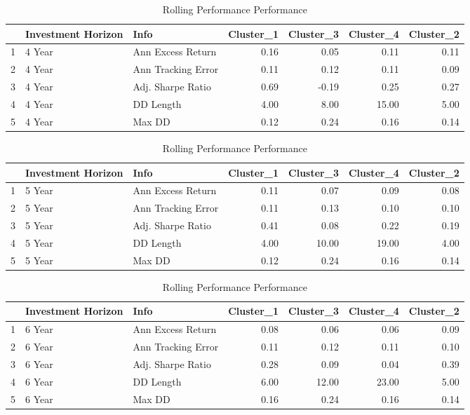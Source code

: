 \documentclass[11pt,preprint, authoryear]{elsarticle}
\numberwithin{equation}{section}
\numberwithin{figure}{section}
\numberwithin{table}{section}
\begin{document}
\begin{longtable}{rllrrrr}
\caption{Rolling Performance Performance \label{tab9}} \\ 
  \hline
 & Investment Horizon & Info & Cluster\_1 & Cluster\_3 & Cluster\_4 & Cluster\_2 \\ 
  \hline
1 & 4 Year & Ann Excess Return & 0.16 & 0.05 & 0.11 & 0.11 \\ 
  2 & 4 Year & Ann Tracking Error & 0.11 & 0.12 & 0.11 & 0.09 \\ 
  3 & 4 Year & Adj. Sharpe Ratio & 0.69 & -0.19 & 0.25 & 0.27 \\ 
  4 & 4 Year & DD Length & 4.00 & 8.00 & 15.00 & 5.00 \\ 
  5 & 4 Year & Max DD & 0.12 & 0.24 & 0.16 & 0.14 \\ 
   \hline
\hline
\end{longtable}

\begin{longtable}{rllrrrr}
\caption{Rolling Performance Performance \label{tab10}} \\ 
  \hline
 & Investment Horizon & Info & Cluster\_1 & Cluster\_3 & Cluster\_4 & Cluster\_2 \\ 
  \hline
1 & 5 Year & Ann Excess Return & 0.11 & 0.07 & 0.09 & 0.08 \\ 
  2 & 5 Year & Ann Tracking Error & 0.11 & 0.13 & 0.10 & 0.10 \\ 
  3 & 5 Year & Adj. Sharpe Ratio & 0.41 & 0.08 & 0.22 & 0.19 \\ 
  4 & 5 Year & DD Length & 4.00 & 10.00 & 19.00 & 4.00 \\ 
  5 & 5 Year & Max DD & 0.12 & 0.24 & 0.16 & 0.14 \\ 
   \hline
\hline
\end{longtable}

\begin{longtable}{rllrrrr}
\caption{Rolling Performance Performance \label{tab11}} \\ 
  \hline
 & Investment Horizon & Info & Cluster\_1 & Cluster\_3 & Cluster\_4 & Cluster\_2 \\ 
  \hline
1 & 6 Year & Ann Excess Return & 0.08 & 0.06 & 0.06 & 0.09 \\ 
  2 & 6 Year & Ann Tracking Error & 0.11 & 0.12 & 0.11 & 0.10 \\ 
  3 & 6 Year & Adj. Sharpe Ratio & 0.28 & 0.09 & 0.04 & 0.39 \\ 
  4 & 6 Year & DD Length & 6.00 & 12.00 & 23.00 & 5.00 \\ 
  5 & 6 Year & Max DD & 0.16 & 0.24 & 0.16 & 0.14 \\ 
   \hline
\hline
\end{longtable}
\end{document}
